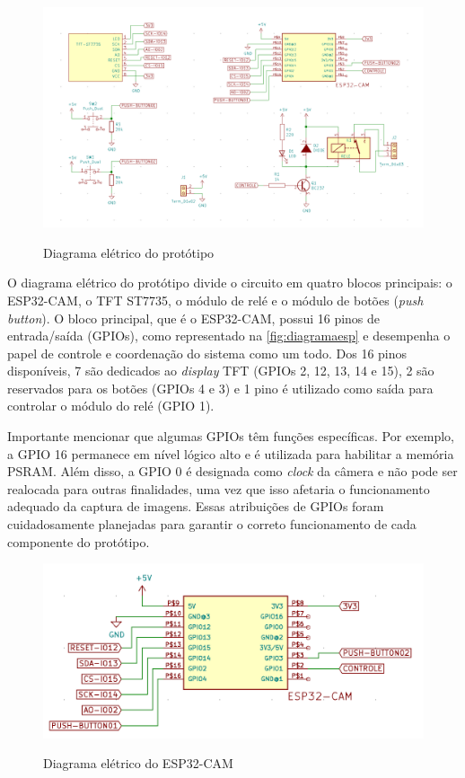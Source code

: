 \begin{figure}[h!]
    \centering
    \caption{Diagrama elétrico do protótipo}
    \includegraphics[scale=0.3]{figuras/circuito_completo.png}
    \fonte{}%
    \label{fig:circuito}
    \centering
\end{figure}

O diagrama elétrico do protótipo divide o circuito em quatro blocos 
principais: o ESP32-CAM, o TFT ST7735, o módulo de relé e o módulo 
de botões (\textit{push button}). O bloco principal, que é o ESP32-CAM, 
possui 16 pinos de entrada/saída (GPIOs), como representado na 
\autoref{fig:diagramaesp} e desempenha o papel de controle e 
coordenação do sistema como um todo. Dos 16 pinos disponíveis, 
7 são dedicados ao \textit{display} TFT (GPIOs 2, 12, 13, 14 e 15), 2 são 
reservados para os botões (GPIOs 4 e 3) e 1 pino é utilizado 
como saída para controlar o módulo do relé (GPIO 1).

Importante mencionar que algumas GPIOs têm funções específicas. 
Por exemplo, a GPIO 16 permanece em nível lógico alto e é utilizada 
para habilitar a memória PSRAM. Além disso, a GPIO 0 é designada como 
\textit{clock} da câmera e não pode ser realocada para outras finalidades, 
uma vez que isso afetaria o funcionamento adequado da captura de 
imagens. Essas atribuições de GPIOs foram cuidadosamente 
planejadas para garantir o correto funcionamento de 
cada componente do protótipo. 

\begin{figure}[h!]
    \centering
    \caption{Diagrama elétrico do ESP32-CAM}
    \includegraphics[scale=0.3]{figuras/modulo_esp.png}
    \fonte{}%
    \label{fig:diagramaesp}
    \centering
\end{figure}

